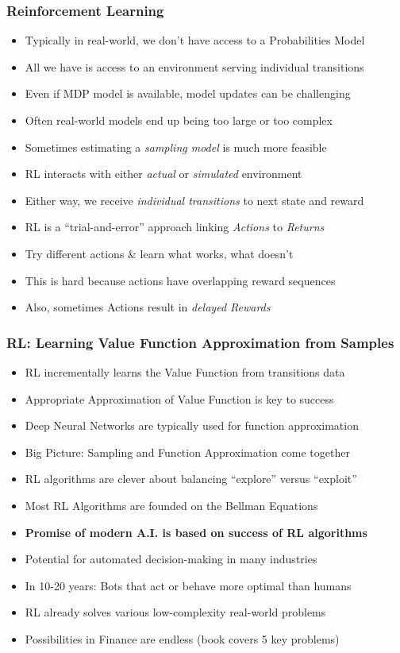 \documentclass[handout]{beamer}
\begin{document}
\begin{frame}
\frametitle{Reinforcement Learning}
\pause
\begin{itemize}[<+->]
\item Typically in real-world, we don't have access to a Probabilities Model
\item All we have is access to an environment serving individual transitions
\item Even if MDP model is available, model updates can be challenging
\item Often real-world models end up being too large or too complex
\item Sometimes estimating a {\em sampling model} is much more feasible
\item RL interacts with either {\em actual} or {\em simulated} environment
\item Either way, we receive {\em individual transitions} to next state and reward
\item RL is a ``trial-and-error'' approach linking {\em Actions} to {\em Returns}
\item Try different actions \& learn what works, what doesn't
\item This is hard because actions have overlapping reward sequences
\item Also, sometimes Actions result in {\em delayed Rewards}
\end{itemize}
\end{frame}

\begin{frame}
\frametitle{RL: Learning Value Function Approximation from Samples}
\pause
\begin{itemize}[<+->]
\item RL incrementally learns the Value Function from transitions data
\item Appropriate Approximation of Value Function is key to success
\item Deep Neural Networks are typically used for function approximation
\item Big Picture: Sampling and Function Approximation come together
\item RL algorithms are clever about balancing  ``explore'' versus ``exploit''
\item Most RL Algorithms are founded on the Bellman Equations
\item {\bf Promise of modern A.I. is based on success of RL algorithms}
\item Potential for automated decision-making in many industries
\item In 10-20 years: Bots that act or behave more optimal than humans
\item RL already solves various low-complexity real-world problems
\item Possibilities in Finance are endless (book covers 5 key problems)
\end{itemize}
\end{frame}
\end{document}

